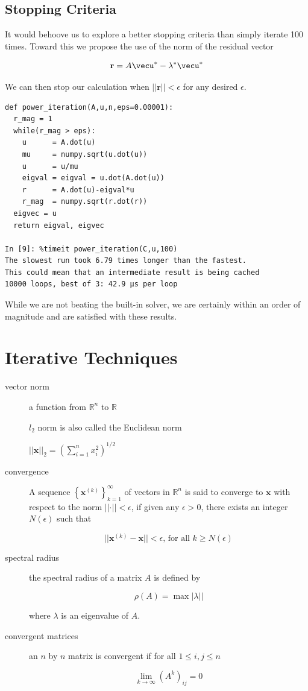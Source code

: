\documentclass[12pt,]{book}
\newcommand{\R}{\mathbb{R}}
\begin{document}
\subsection{Stopping Criteria}\label{stopping-criteria}

It would behoove us to explore a better stopping criteria than simply
iterate 100 times. Toward this we propose the use of the norm of the
residual vector

\[\mathbf{r}=A\vecu^*-\lambda^*\vecu^*\]

We can then stop our calculation when
\(\rvert\rvert\mathbf r \rvert\rvert<\epsilon\) for any desired
\(\epsilon\).

\begin{verbatim}
def power_iteration(A,u,n,eps=0.00001):
  r_mag = 1
  while(r_mag > eps):
    u      = A.dot(u)
    mu     = numpy.sqrt(u.dot(u))
    u      = u/mu
    eigval = eigval = u.dot(A.dot(u))
    r      = A.dot(u)-eigval*u
    r_mag  = numpy.sqrt(r.dot(r))
  eigvec = u
  return eigval, eigvec

In [9]: %timeit power_iteration(C,u,100)
The slowest run took 6.79 times longer than the fastest. 
This could mean that an intermediate result is being cached
10000 loops, best of 3: 42.9 µs per loop
\end{verbatim}

While we are not beating the built-in solver, we are certainly within an
order of magnitude and are satisfied with these results.

\section{Iterative Techniques}\label{iterative-techniques}

\begin{description}
\item[vector norm]
a function from \(\R^n\) to \(\R\)

\(l_2\) norm is also called the Euclidean norm

\(\rvert\rvert \mathbf{x} \rvert\rvert_2 = \left(\sum_{i=1}^nx_i^2\right)^{1/2}\)
\item[convergence]
A sequence \(\left\{\mathbf{x}^{(k)}\right\}_{k=1}^\infty\) of vectors
in \(\R^n\) is said to converge to \(\mathbf{x}\) with respect to the
norm \(\rvert\rvert \cdot \rvert\rvert<\epsilon\), if given any
\(\epsilon>0\), there exists an integer \(N(\epsilon)\) such that

\[\rvert\rvert\mathbf{x}^{(k)}-\mathbf{x}\rvert\rvert<\epsilon
  \text{, for all }k\geq N(\epsilon)\]
\item[spectral radius]
the spectral radius of a matrix \(A\) is defined by

\[\rho(A)=\max\rvert\lambda\rvert|\]

where \(\lambda\) is an eigenvalue of \(A\).
\item[convergent matrices]
an \(n\) by \(n\) matrix is convergent if for all \(1\leq i,j \leq n\)

\[\lim_{k\to\infty}(A^k)_{ij}=0\]
\end{description}
\end{document}
